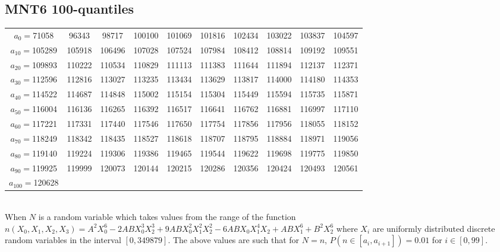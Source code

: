 \documentclass[a4paper, 12pt, envcountsect, runningheads]{llncs}
\numberwithin{figure}{section}
\numberwithin{equation}{section}
\begin{document}
\subsection{MNT6 100-quantiles}\label{A:MNT100quantiles}
{\small{
\begin{tabular}{cccccccccc}
$a_0=$71058 &96343& 98717&100100&101069&101816&102434&103022&103837&104597\\
$a_{10}=$105289&105918&106496&107028&107524&107984&108412&108814&109192&109551\\
$a_{20}=$109893&110222&110534&110829&111113&111383&111644&111894&112137&112371\\
$a_{30}=$112596&112816&113027&113235&113434&113629&113817&114000&114180&114353\\
$a_{40}=$114522&114687&114848&115002&115154&115304&115449&115594&115735&115871\\
$a_{50}=$116004&116136&116265&116392&116517&116641&116762&116881&116997&117110\\
$a_{60}=$117221&117331&117440&117546&117650&117754&117856&117956&118055&118152\\
$a_{70}=$118249&118342&118435&118527&118618&118707&118795&118884&118971&119056\\
$a_{80}=$119140&119224&119306&119386&119465&119544&119622&119698&119775&119850\\
$a_{90}=$119925&119999& 120073& 120144& 120215& 120286&120356&120424&120493&120561\\
$a_{100}=$120628&&&&&&&&&\\
\end{tabular}
}}\\
When $N$ is a random variable which takes values from the range of the function $n(X_0,X_1,X_2,X_3)=A^2 X_0^6 - 2 A B X_0^3 X_2^3 + 9 A B X_0^2 X_1^2 X_2^2 - 6 A B X_0 X_1^4 X_2 + ABX_1^6 + B^2 X_2^6$ where $X_i$ are uniformly distributed discrete random variables in the interval $[0,349879].$ The above values are such that for $N=n$, $P(n\in[a_i,a_{i+1}])=0.01$ for $i\in[0,99]$.
\end{document}
